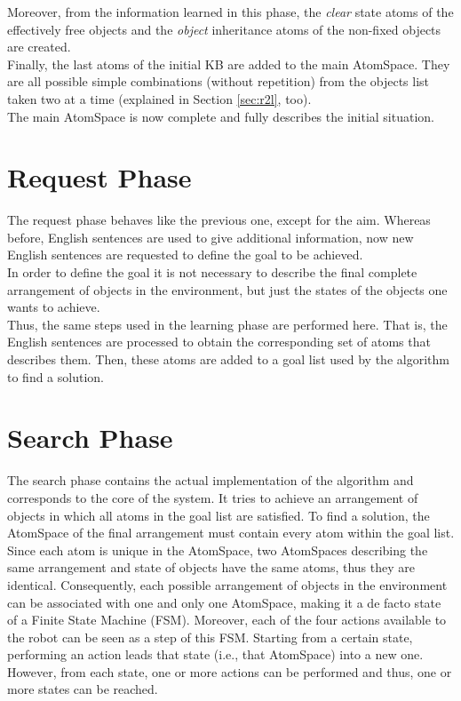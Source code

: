 Moreover, from the information learned in this phase, the \textit{clear} state atoms of the effectively free objects and the \textit{object} inheritance atoms of the non-fixed objects are created.  \\
Finally, the last atoms of the initial KB are added to the main AtomSpace. They are all possible simple combinations (without repetition) from the objects list taken two at a time (explained in Section \ref{sec:r2l}, too). \\
The main AtomSpace is now complete and fully describes the initial situation. 

\section{Request Phase}\label{sec:request}

The request phase behaves like the previous one, except for the aim. Whereas before, English sentences are used to give additional information, now new English sentences are requested to define the goal to be achieved. \\
In order to define the goal it is not necessary to describe the final complete arrangement of objects in the environment, but just the states of the objects one wants to achieve. \\
Thus, the same steps used in the learning phase are performed here. That is, the English sentences are processed to obtain the corresponding set of atoms that describes them. Then, these atoms are added to a goal list used by the algorithm to find a solution.

\section{Search Phase}\label{sec:search}

The search phase contains the actual implementation of the algorithm and corresponds to the core of the system. It tries to achieve an arrangement of objects in which all atoms in the goal list are satisfied.
To find a solution, the AtomSpace of the final arrangement must contain every atom within the goal list. \\

Since each atom is unique in the AtomSpace, two AtomSpaces describing the same arrangement and state of objects have the same atoms, thus they are identical. 
Consequently, each possible arrangement of objects in the environment can be associated with one and only one AtomSpace, making it a de facto state of a Finite State Machine (FSM).
Moreover, each of the four actions available to the robot can be seen as a step of this FSM. 
Starting from a certain state, performing an action leads that state (i.e., that AtomSpace) into a new one. However, from each state, one or more actions can be performed and thus, one or more states can be reached. \\

